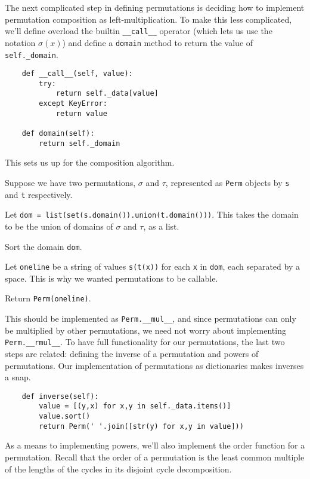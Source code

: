 \documentclass[m3380-lec-main.tex]{subfiles}
\begin{document}
The next complicated step in defining permutations is deciding how to implement permutation composition as left-multiplication. To make this less complicated, we'll define overload the builtin \verb|__call__| operator (which lets us use the notation $\sigma(x)$) and define a \verb|domain| method to return the value of \verb|self._domain|.

\bc\begin{verbatim}
    def __call__(self, value):
        try:
            return self._data[value]
        except KeyError:
            return value

    def domain(self):
        return self._domain
\end{verbatim}
\ec
This sets us up for the composition algorithm.
\begin{alg}
Suppose we have two permutations, $\sigma$ and $\tau$, represented as \verb|Perm| objects by \verb|s| and \verb|t| respectively.
\begin{enum}
\item Let \verb|dom = list(set(s.domain()).union(t.domain()))|. This takes the domain to be the union of domains of $\sigma$ and $\tau$, as a list.
\item Sort the domain \verb|dom|.
\item Let \verb|oneline| be a string of values \verb|s(t(x))| for each \verb|x| in \verb|dom|, each separated by a space. This is why we wanted permutations to be callable.
\item Return \verb|Perm(oneline)|.
\end{enum}
\end{alg}
This should be implemented as \verb|Perm.__mul__|, and since permutations can only be multiplied by other permutations, we need not worry about implementing \verb|Perm.__rmul__|. To have full functionality for our permutations, the last two steps are related: defining the inverse of a permutation and powers of permutations. Our implementation of permutations as dictionaries makes inverses a snap.

\bc\begin{verbatim}
    def inverse(self):
        value = [(y,x) for x,y in self._data.items()]
        value.sort()
        return Perm(' '.join([str(y) for x,y in value]))
\end{verbatim}
\ec

As a means to implementing powers, we'll also implement the order function for a permutation. Recall that the order of a permutation is the least common multiple of the lengths of the cycles in its disjoint cycle decomposition.
\end{document}
